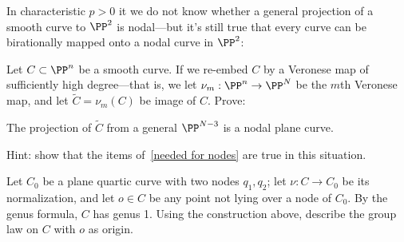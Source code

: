 In characteristic $p > 0$ it we do not know whether a general projection of a smooth curve to $\PP^2$ is nodal---but it's still true that every curve can be birationally mapped onto a nodal curve in $\PP^2$:

\begin{exercise}
Let $C\subset \PP^n$ be a smooth curve. If we re-embed $C$ by a Veronese map of sufficiently high degree---that is, we let $\nu_m : \PP^n \to \PP^N$ be the $m$th Veronese map, and let $\widetilde C = \nu_m(C)$ be image of $C$. Prove:

\begin{proposition}\label{positive characteristic nodes}
The projection of $\widetilde C$ from a general $\PP^{N-3}$ is a nodal plane curve.
\end{proposition}

Hint: show that the items of~\ref{needed for nodes}  are true in this situation.
\end{exercise}

\begin{exercise}
Let $C_0$ be a plane quartic curve with two nodes $q_1, q_2$; let $\nu : C \to C_0$ be its normalization, and let $o \in C$ be any point not lying over a node of $C_0$.
By the genus formula, $C$ has genus 1. Using the construction above, describe the group law on $C$ with $o$ as origin.
\end{exercise}

